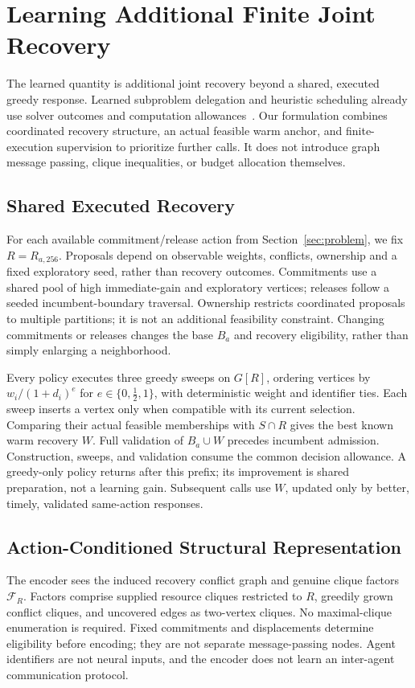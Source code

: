 \section{Learning Additional Finite Joint Recovery}
\label{sec:method-residual}

The learned quantity is additional joint recovery beyond a shared, executed
greedy response. Learned subproblem delegation and heuristic scheduling
already use solver outcomes and computation allowances~\cite{li2021delegate,chmiela2021schedule}.
Our formulation combines coordinated recovery structure, an actual feasible
warm anchor, and finite-execution supervision to prioritize further calls.
It does not introduce graph message passing, clique inequalities, or
budget allocation themselves.

\subsection{Shared Executed Recovery}
For each available commitment/release action from Section~\ref{sec:problem},
we fix $R=R_{a,256}$. Proposals depend on observable weights, conflicts,
ownership and a fixed exploratory seed, rather than recovery outcomes.
Commitments use a shared pool of high immediate-gain and exploratory
vertices; releases follow a seeded incumbent-boundary traversal.
Ownership restricts coordinated proposals to multiple partitions; it is
not an additional feasibility constraint. Changing commitments or releases
changes the base $B_a$ and recovery eligibility, rather than simply enlarging
a neighborhood.

Every policy executes three greedy sweeps on $G[R]$, ordering vertices by
$w_i/(1+d_i)^e$ for $e\in\{0,\frac12,1\}$, with deterministic weight and
identifier ties. Each sweep inserts a vertex only when compatible with its
current selection. Comparing their actual feasible memberships with
$S\cap R$ gives the best known warm recovery $W$. Full validation of
$B_a\cup W$ precedes incumbent admission. Construction, sweeps, and
validation consume the common decision allowance. A greedy-only policy
returns after this prefix; its improvement is shared preparation, not a
learning gain. Subsequent calls use $W$, updated only by better, timely,
validated same-action responses.

\subsection{Action-Conditioned Structural Representation}
The encoder sees the induced recovery conflict graph and genuine clique
factors $\mathcal F_R$. Factors comprise supplied resource cliques restricted
to $R$, greedily grown conflict cliques, and uncovered edges as two-vertex
cliques. No maximal-clique enumeration is required. Fixed commitments and
displacements determine eligibility before encoding; they are not separate
message-passing nodes. Agent identifiers are not neural inputs, and the
encoder does not learn an inter-agent communication protocol.

